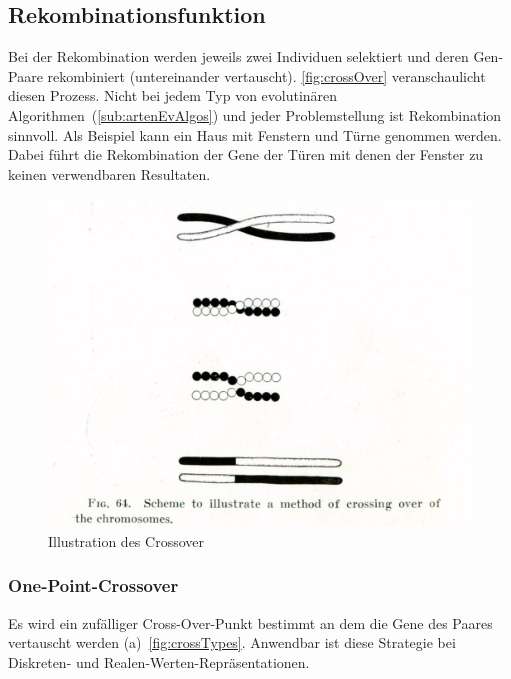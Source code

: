     \subsection{Rekombinationsfunktion}

        Bei der Rekombination werden jeweils zwei Individuen selektiert und
        deren Gen-Paare rekombiniert (untereinander vertauscht).
        \vref{fig:crossOver} veranschaulicht diesen Prozess.
        Nicht bei jedem Typ von evolutinären Algorithmen~(\vref{sub:artenEvAlgos}) und jeder Problemstellung ist Rekombination sinnvoll.
        Als Beispiel kann ein Haus mit Fenstern und Türne genommen werden.
        Dabei führt die Rekombination der Gene der Türen mit denen der Fenster zu keinen verwendbaren Resultaten.

        \begin{figure}[H]
          \includegraphics[scale=0.3, center]{graphics/morgan_crossover}
          \caption[\protect{}]{Illustration des Crossover~\label{fig:crossOver}}
        \end{figure}

        \subsubsection{One-Point-Crossover}

          Es wird ein zufälliger Cross-Over-Punkt bestimmt an dem die Gene des Paares vertauscht werden (a)~\vref{fig:crossTypes}.
          Anwendbar ist diese Strategie bei Diskreten- und Realen-Werten-Repräsentationen.

